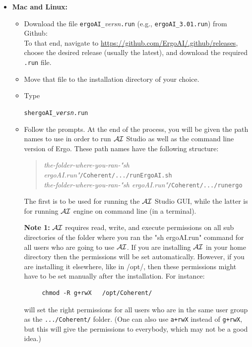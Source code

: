 \documentclass[11pt]{article}
\newcommand{\ERGOAI}{\mbox{\smaller{\ensuremath{\cal{E}}\smaller{{\sc{RGO}}}}\ensuremath{\cal{AI}}}\xspace}
\begin{document}
\begin{itemize}
\item[] \textbf{Mac and Linux:}  
  \begin{itemize}
  \item  Download the file \texttt{ergoAI\_}\textnormal{\textit{versn}}\texttt{.run}
    (e.g., \verb|ergoAI_3.01.run|) from Github:\\
    To that end, navigate to
    \url{https://github.com/ErgoAI/.github/releases}, 
    choose the desired release (usually the latest), and download the
    required \texttt{.run} file. 
  \item Move that file to the installation directory of your choice.
  \item Type
\begin{alltt}
    sh ergoAI\_\textnormal{\it{}versn}.run 
\end{alltt}
  \item Follow the prompts. At the end of the process, you will be given
    the path names to use in order to run \ERGOAI Studio as well as the
    command line version of Ergo. These path names have the following
    structure:
    \begin{quote}
      \emph{the-folder-where-you-ran-"sh ergoAI.run"}\texttt{/Coherent/.../runErgoAI.sh}\\
      \emph{the-folder-where-you-ran-"sh ergoAI.run"}\texttt{/Coherent/.../runergo}
    \end{quote}
    The first is to be used for running the \ERGOAI Studio GUI, while the
    latter is for running \ERGOAI engine on command line (in a terminal).

    \textbf{Note 1:} \ERGOAI requires read, write, and execute permissions
    on all sub directories of the folder where you ran the "sh ergoAI.run"
    command for all users who are going to use \ERGOAI. If
    you are installing \ERGOAI in your home directory then the permissions
    will be set automatically. However, if you are installing it elsewhere,
    like in /opt/, then these permissions might have to be set manually
    after the installation. For instance:
\begin{verbatim}
     chmod -R g+rwX   /opt/Coherent/ 
\end{verbatim}
    will set the right permissions for all users who are in the same user
    group as the \texttt{.../Coherent/} folder.  (One can also use
    \texttt{a+rwX} instead of \texttt{g+rwX}, but this will give the
    permissions to everybody, which may not be a good idea.)


\end{itemize}
\end{itemize}
\end{document}

